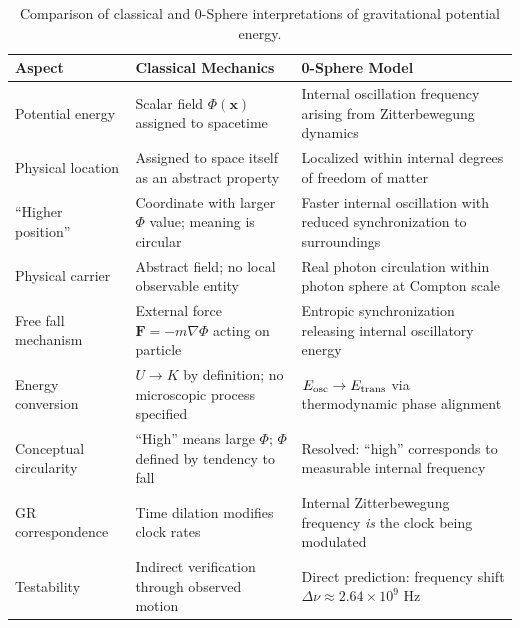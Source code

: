 \documentclass[%
 reprint,
 amsmath,amssymb,
 aps,
 prb,
]{revtex4-2}
\numberwithin{equation}{section}
\begin{document}
\begin{table}[t!]
\centering
\caption{Comparison of classical and 0-Sphere interpretations of gravitational potential energy.}
\label{tab:comparison}
\renewcommand{\arraystretch}{1.4}
\begin{tabular}{p{4.0cm}p{5.5cm}p{6.0cm}}
\toprule
\textbf{Aspect} & \textbf{Classical Mechanics} & \textbf{0-Sphere Model} \\
\midrule
Potential energy
& Scalar field $\Phi(\mathbf{x})$ assigned to spacetime
& Internal oscillation frequency arising from Zitterbewegung dynamics \\
\addlinespace[0.25cm]
Physical location
& Assigned to space itself as an abstract property
& Localized within internal degrees of freedom of matter \\
\addlinespace[0.25cm]
``Higher position''
& Coordinate with larger $\Phi$ value; meaning is circular
& Faster internal oscillation with reduced synchronization to surroundings \\
\addlinespace[0.25cm]
Physical carrier
& Abstract field; no local observable entity
& Real photon circulation within photon sphere at Compton scale \\
\addlinespace[0.25cm]
Free fall mechanism
& External force $\mathbf{F} = -m\nabla\Phi$ acting on particle
& Entropic synchronization releasing internal oscillatory energy \\
\addlinespace[0.25cm]
Energy conversion
& $U \to K$ by definition; no microscopic process specified
& $E_{\rm osc} \to E_{\rm trans}$ via thermodynamic phase alignment \\
\addlinespace[0.25cm]
Conceptual circularity
& ``High'' means large $\Phi$; $\Phi$ defined by tendency to fall
& Resolved: ``high'' corresponds to measurable internal frequency \\
\addlinespace[0.25cm]
GR correspondence
& Time dilation modifies clock rates
& Internal Zitterbewegung frequency \emph{is} the clock being modulated \\
\addlinespace[0.25cm]
Testability
& Indirect verification through observed motion
& Direct prediction: frequency shift $\Delta\nu \approx 2.64 \times 10^9$ Hz \\
\bottomrule
\end{tabular}
\vspace{0.4em}
\begin{minipage}{0.95\textwidth}

\end{minipage}
\end{table}
\end{document}
